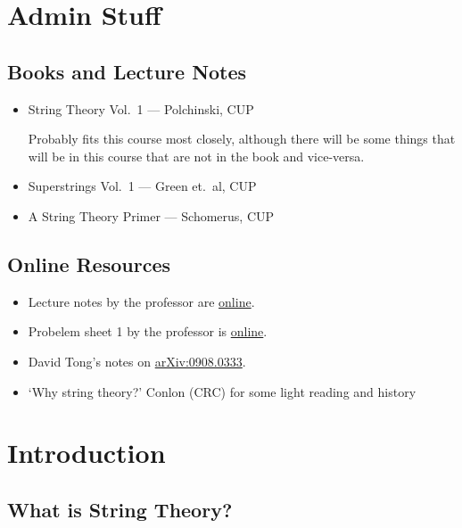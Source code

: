 
\chapter*{Admin Stuff}%

\section*{Books and Lecture Notes}%

\begin{itemize}
  \item String Theory Vol.~1 --- Polchinski, CUP

  Probably fits this course most closely, although there will be some things that will be in this course that are not in the book and vice-versa.

  \item Superstrings Vol.~1 --- Green et.~al, CUP

  \item A String Theory Primer --- Schomerus, CUP
\end{itemize}

\section*{Online Resources}%

\begin{itemize}
  \item Lecture notes by the professor are \href{www.damtp.cam.ac.uk/user/rar31/LectureNotes.pdf}{online}.
  \item Probelem sheet 1 by the professor is \href{www.damtp.cam.ac.uk/user/rar31/ProblemSet1.pdf}{online}.
  \item David Tong's notes on \href{https://arxiv.org/abs/0908.0333}{arXiv:0908.0333}.
  \item `Why string theory?' Conlon (CRC) for some light reading and history
\end{itemize}

\chapter{Introduction}%
\label{cha:introduction}

\section{What is String Theory?}%
\label{sec:what_is_string_theory_}

